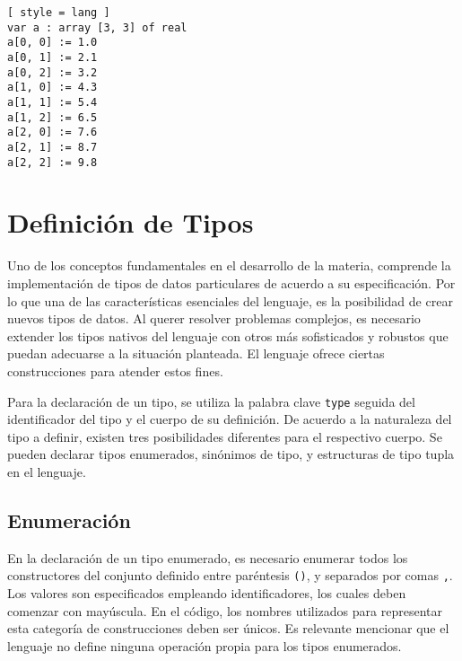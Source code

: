 \begin{lstlisting}[ style = lang ]
var a : array [3, 3] of real
a[0, 0] := 1.0
a[0, 1] := 2.1
a[0, 2] := 3.2
a[1, 0] := 4.3
a[1, 1] := 5.4
a[1, 2] := 6.5
a[2, 0] := 7.6
a[2, 1] := 8.7
a[2, 2] := 9.8
\end{lstlisting}




\section{Definición de Tipos}

Uno de los conceptos fundamentales en el desarrollo de la materia, comprende la implementación de tipos de datos particulares de acuerdo a su especificación.
Por lo que una de las características esenciales del lenguaje, es la posibilidad de crear nuevos tipos de datos.
Al querer resolver problemas complejos, es necesario extender los tipos nativos del lenguaje con otros más sofisticados y robustos que puedan adecuarse a la situación planteada.
El lenguaje ofrece ciertas construcciones para atender estos fines.

Para la declaración de un tipo, se utiliza la palabra clave \lstinline[style = lang]{type} seguida del identificador del tipo y el cuerpo de su definición.
De acuerdo a la naturaleza del tipo a definir, existen tres posibilidades diferentes para el respectivo cuerpo.
Se pueden declarar tipos enumerados, sinónimos de tipo, y estructuras de tipo tupla en el lenguaje.

\subsection{Enumeración}

En la declaración de un tipo enumerado, es necesario enumerar todos los constructores del conjunto definido entre paréntesis \lstinline[style = lang]{()}, y separados por comas \lstinline[style = lang]{,}.
Los valores son especificados empleando identificadores, los cuales deben comenzar con mayúscula.
En el código, los nombres utilizados para representar esta categoría de construcciones deben ser únicos.
Es relevante mencionar que el lenguaje no define ninguna operación propia para los tipos enumerados.

